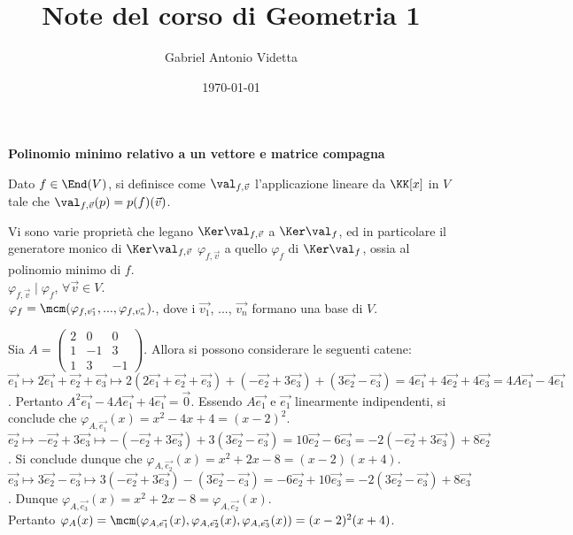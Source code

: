 \documentclass[11pt]{article}
\title{\textbf{Note del corso di Geometria 1}}
\author{Gabriel Antonio Videtta}
\date{\today}
\begin{document}
\maketitle

\begin{center}
    \Large \textbf{Polinomio minimo relativo a un vettore e matrice compagna}
\end{center}

\begin{definition} Dato $f \in \End(V)$, si definisce
come $\val_{f, \vec{v}}$ l'applicazione
lineare da $\KK[x]$ in $V$ tale che
$\val_{f, \vec{v}}(p) = p(f)(\vec{v})$.
\end{definition}

\begin{remark} Vi sono varie proprietà
che legano $\Ker \val_{f, \vec{v}}$
a $\Ker \val_f$, ed in particolare
il generatore monico di $\Ker \val_{f, \vec{v}}$
$\varphi_{f, \vec{v}}$ a quello
$\varphi_{f}$ di $\Ker \val_f$, ossia al polinomio minimo di $f$. \\

\li $\varphi_{f, \vec{v}} \mid \varphi_{f}$, $\forall \vec{v} \in V$. \\
\li $\varphi_{f} = \mcm(\varphi_{f, \vec{v_1}}, ..., \varphi_{f, \vec{v_n}}).$, dove i $\vec{v_1}$, ...,
$\vec{v_n}$ formano una base di $V$. \\
\end{remark}

\begin{example} Sia $A = \begin{pmatrix}2 & 0 & 0 \\ 1 & -1 & 3 \\ 1 & 3 & -1 \end{pmatrix}$. Allora
si possono considerare le seguenti
catene: \\

\li $\vec{e_1} \mapsto 2\vec{e_1} + \vec{e_2} + \vec{e_3} \mapsto 2(2\vec{e_1} + \vec{e_2} + \vec{e_3}) + (-\vec{e_2} + 3\vec{e_3})
+ (3\vec{e_2} -\vec{e_3}) = 4\vec{e_1} + 4\vec{e_2} + 4\vec{e_3} = 4 A \vec{e_1} - 4 \vec{e_1}$.
Pertanto $A^2 \vec{e_1} - 4 A \vec{e_1} + 4 \vec{e_1} = \vec{0}$.
Essendo $A \vec{e_1}$ e $\vec{e_1}$ linearmente indipendenti, si conclude
che $\varphi_{A, \vec{e_1}}(x) = x^2 - 4x + 4 = (x-2)^2$. \\
\li $\vec{e_2} \mapsto -\vec{e_2} + 3\vec{e_3} \mapsto -(-\vec{e_2} + 3\vec{e_3}) + 3(3\vec{e_2} -\vec{e_3}) = 10\vec{e_2} - 6\vec{e_3} = -2(-\vec{e_2} + 3\vec{e_3}) + 8\vec{e_2}$.
Si conclude dunque che $\varphi_{A, \vec{e_2}}(x) = x^2+2x-8 = (x-2)(x+4)$. \\
\li $\vec{e_3} \mapsto 3\Vec{e_2}-\Vec{e_3} \mapsto 3(-\Vec{e_2} + 3\Vec{e_3}) - (3\Vec{e_2} - \Vec{e_3}) = -6\Vec{e_2} + 10\Vec{e_3} = -2(3\Vec{e_2} - \Vec{e_3}) + 8\Vec{e_3}$. Dunque
$\varphi_{A,\Vec{e_3}}(x) = x^2+2x-8 = \varphi_{A,\Vec{e_2}}(x)$. \\

Pertanto $\varphi_A(x) = \mcm(\varphi_{A,\Vec{e_1}}(x),\varphi_{A,\Vec{e_2}}(x),\varphi_{A,\Vec{e_3}}(x)) = (x-2)^2(x+4)$.
\end{example}
\end{document}

